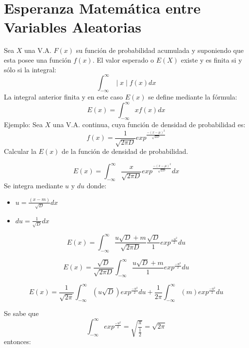 \documentclass[11pt,fleqn]{book} %
\numberwithin{equation}{section} %
\numberwithin{figure}{section} %
\numberwithin{table}{section} %
\begin{document}
\section{Esperanza Matemática entre Variables Aleatorias}
Sea $X$ una V.A. $F(x)$ su función de probabilidad acumulada y suponiendo que esta posee una función $f(x)$. El valor esperado o $E(X)$ existe y es finita si y sólo si la integral:
$$ \int_{-\infty}^{\infty} \mid x \mid f(x) dx$$
La integral anterior finita y en este caso $E(x)$ se define mediante la fórmula:
$$E(x) = \int_{-\infty}^{\infty} x f(x) dx$$
Ejemplo: Sea $X$ una V.A. continua, cuya función de densidad de probabilidad es:
$$f(x) = \frac{1}{\sqrt{2 \pi D}} exp^\frac{-(x - \mu)^2}{\sqrt{2 D}}$$
Calcular la $E(x)$ de la función de densidad de probabilidad.

$$E(x) = \int_{-\infty}^{\infty} \frac{x}{\sqrt{2 \pi D}} exp^\frac{-(x - \mu)^2}{\sqrt{2 D}} dx$$
Se integra mediante $u$ y $du$ donde:
\begin{itemize}
    \item $ u = \frac{(x-m)}{\sqrt{D}} dx $ 
    \item $ du = \frac{1}{\sqrt{D}} dx$
\end{itemize}
$$E(x) = \int_{-\infty}^{\infty} \frac{u\sqrt{D}+m}{\sqrt{2 \pi D}}   \frac{\sqrt{D}}{1} exp^{\frac{-u^2}{2}}  du $$

$$E(x) = \frac{\sqrt{D}}{\sqrt{2 \pi D}}  \int_{-\infty}^{\infty}  \frac{u\sqrt{D}+m}{1}exp^{\frac{-u^2}{2}} du $$

$$E(x) = \frac{1}{\sqrt{2 \pi}} \int_{-\infty}^{\infty}  (u\sqrt{D}) exp^{\frac{-u^2}{2}} du  + \frac{1}{2 \pi} \int_{-\infty}^{\infty} (m) exp^{\frac{-u^2}{2}} du$$

Se sabe que 
$$\int_{-\infty}^{\infty}exp^{\frac{-u^2}{2}} = \sqrt{\frac{\pi}{\frac{1}{2}}} = \sqrt{2 \pi}$$
entonces:
\end{document}
